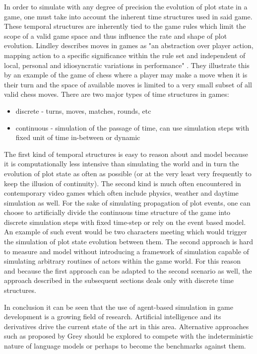 In order to simulate with any degree of precision the evolution of plot state in a game, one must take into account the inherent time structures used in said game.
These temporal structures are inherently tied to the game rules which limit the scope of a valid game space and thus influence the rate and shape of plot evolution.
Lindley describes moves in games as "an abstraction over player action, mapping action to a specific significance within the rule set and independent of local, personal and idiosyncratic variations in performance" \cite{lindley2005story}.
They illustrate this by an example of the game of chess where a player may make a move when it is their turn and the space of available moves is limited to a very small subset of all valid chess moves.
There are two major types of time structures in games:

\begin{itemize}
    \item discrete - turns, moves, matches, rounds, etc
    \item continuous - simulation of the passage of time, can use simulation steps with fixed unit of time in-between or dynamic
\end{itemize}

The first kind of temporal structures is easy to reason about and model because it is computationally less intensive than simulating the world and in turn the evolution of plot state as often as possible (or at the very least very frequently to keep the illusion of continuity).
The second kind is much often encountered in contemporary video games which often include physics, weather and daytime simulation as well.
For the sake of simulating propagation of plot events, one can choose to artificially divide the continuous time structure of the game into discrete simulation steps with fixed time-step or rely on the event based model.
An example of such event would be two characters meeting which would trigger the simulation of plot state evolution between them.
The second approach is hard to measure and model without introducing a framework of simulation capable of simulating arbitrary routines of actors within the game world.
For this reason and because the first approach can be adapted to the second scenario as well, the approach described in the subsequent sections deals only with discrete time structures.

In conclusion it can be seen that the use of agent-based simulation in game development is a growing field of research.
Artificial intelligence and its derivatives drive the current state of the art in this area.
Alternative approaches such as proposed by Grey\cite{grey2011procedural} should be explored to compete with the indeterministic nature of language models or perhaps to become the benchmarks against them.

